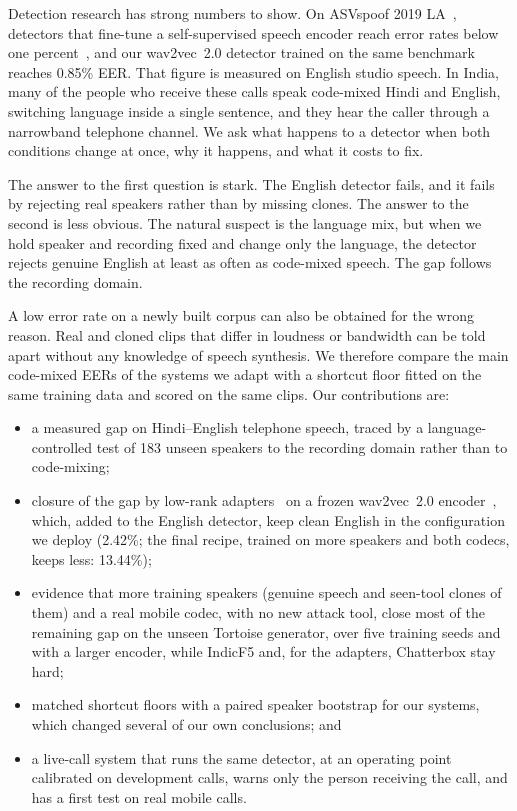\documentclass[conference]{IEEEtran}
\begin{document}
Detection research has strong numbers to show. On ASVspoof 2019 LA~\cite{todisco2019asvspoof},
detectors that fine-tune a self-supervised speech encoder reach error rates below one
percent~\cite{tak2022wav2vec}, and our wav2vec~2.0 detector trained on the same benchmark
reaches 0.85\% EER. That figure is
measured on English studio speech. In India, many of the people who receive these calls
speak code-mixed Hindi and English, switching language inside a single sentence, and they
hear the caller through a narrowband telephone channel. We ask what happens to a detector
when both conditions change at once, why it happens, and what it costs to fix.

The answer to the first question is stark. The English detector fails, and it fails by
rejecting real speakers rather than by missing clones. The answer to the second is less
obvious. The natural suspect is the language mix, but when we hold speaker and recording
fixed and change only the language, the detector rejects genuine English at least as often
as code-mixed speech. The gap follows the recording domain.

A low error rate on a newly built corpus can also be obtained for the wrong reason. Real
and cloned clips that differ in loudness or bandwidth can be told apart without any
knowledge of speech synthesis. We therefore compare the main code-mixed EERs of the systems we
adapt with a shortcut floor fitted on the same training data and scored on the same clips. Our
contributions are:
\begin{itemize}
\item a measured gap on Hindi--English telephone speech, traced by a language-controlled
test of 183 unseen speakers to the recording domain rather than to code-mixing;
\item closure of the gap by low-rank adapters~\cite{hu2022lora} on a frozen wav2vec~2.0
encoder~\cite{baevski2020wav2vec}, which, added to the English detector, keep clean English
in the configuration we deploy (2.42\%; the final recipe, trained on more speakers and both
codecs, keeps less: 13.44\%);
\item evidence that more training speakers (genuine speech and seen-tool clones of them) and
a real mobile codec, with no new attack tool,
close most of the remaining gap on the unseen Tortoise generator, over five training seeds
and with a larger encoder, while IndicF5 and, for the adapters, Chatterbox stay hard;
\item matched shortcut floors with a paired speaker bootstrap for our systems, which
changed several of our own conclusions; and
\item a live-call system that runs the same detector, at an operating point calibrated on
development calls, warns only the person receiving the call, and has a first test on real
mobile calls.
\end{itemize}
\end{document}
